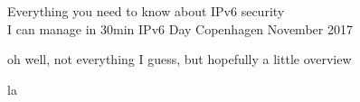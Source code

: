 \documentclass[18pt,landscape,a4paper,footrule]{foils}
\begin{document}
\mytitlepage
{Everything you need to know about IPv6 security\\I can manage in 30min}
{IPv6 Day Copenhagen November 2017}


oh well, not everything I guess, but hopefully a little overview

\begin{list2}
\item
\item
\item
\item
la\item
\end{list2}
\end{document}
